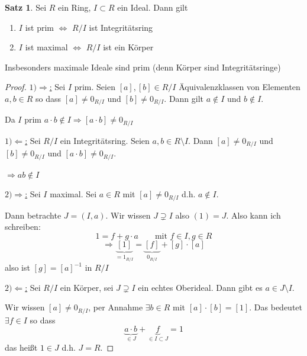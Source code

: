 \documentclass[12pt,parskip=full]{scrartcl}
\newcommand{\heading}{\underline}
\theoremstyle{definition}
\newtheorem{theorem}{Satz}[section]
\theoremstyle{remark}
\begin{document}
	\begin{theorem}
		Sei $R$ ein Ring, $I \subset R$ ein Ideal. Dann gilt
		\begin{enumerate}
			\item $I$ ist prim $\Leftrightarrow$ $R/I$ ist Integritätsring
			\item $I$ ist maximal $\Leftrightarrow$ $R/I$ ist ein Körper
		\end{enumerate}
		Insbesonders maximale Ideale sind prim (denn Körper sind Integritätsringe)
	\end{theorem}

	\begin{proof}
		\heading{$1) \Rightarrow$:} Sei $I$ prim. Seien $[a],[b] \in R/I$ Äquivalenzklassen von Elementen $a,b \in R$ so dass $[a] \neq 0_{R/I}$ und $[b] \neq 0_{R/I}$. Dann gilt $a \notin I$ und $b \notin I$.
		
		Da $I$ prim $a \cdot b \notin I \Rightarrow [a \cdot b] \neq 0_{R/I}$
		
		\heading{$1) \Leftarrow$:} Sei $R/I$ ein Integritätsring. Seien $a,b \in R \setminus I$. Dann $[a] \neq 0_{R/I}$ und $[b] \neq 0_{R/I}$ und $[a \cdot b] \neq 0_{R/I}$.
		
		$\Rightarrow a b \notin I$
		
		\heading{$2) \Rightarrow$:} Sei $I$ maximal. Sei $a \in R$ mit $[a] \neq 0_{R/I}$ d.h. $a \notin I$.
		
		Dann betrachte $J = (I, a)$. Wir wissen $J \supsetneq I$ also $(1) = J$. Also kann ich schreiben:
		\begin{equation*}
			1 = f + g \cdot a \qquad \text{mit $f \in I, g \in R$}
		\end{equation*}
		\begin{equation*}
			\Rightarrow \underbrace{[1]}_{=1_{R/I}} = \underbrace{[f]}_{0_{R/I}} + [g] \cdot [a]
		\end{equation*}
		also ist $[g] = [a]^{-1}$ in $R/I$
		
		\heading{$2) \Leftarrow$:} Sei $R/I$ ein Körper, sei $J \supsetneq I$ ein echtes Oberideal. Dann gibt es $a \in J \setminus I$.
		
		Wir wissen $[a] \neq 0_{R/I}$, per Annahme $\exists b \in R$ mit $[a] \cdot [b] = [1]$. Das bedeutet $\exists f \in I$ so dass
		\begin{equation*}
			\underbrace{a \cdot b}_{\in J} + \underbrace{f}_{\in I \subset J} = 1
		\end{equation*}
		das heißt $1 \in J$ d.h. $J = R$.
	\end{proof}
\end{document}
